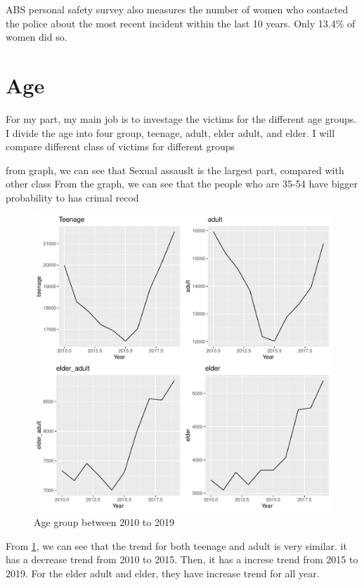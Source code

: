 \documentclass[11pt,a4paper,]{article}
\begin{document}
ABS personal safety survey also measures the number of women who contacted the police about the most recent incident within the last 10 years. Only 13.4\% of women did so.

\clearpage

\section*{Age}

For my part, my main job is to investage the victims for the different age groups. I divide the age into four group, teenage, adult, elder adult, and elder. I will compare different class of victims for different groups

from graph, we can see that Sexual assauslt is the largest part, compared with other class
From the graph, we can see that the people who are 35-54 have bigger probability to has crimal recod

\begin{figure}
\centering
\includegraphics{report_files/figure-latex/ageplot-1.pdf}
\caption{\label{fig:ageplot}Age group between 2010 to 2019}
\end{figure}

From \ref{fig:ageplot}, we can see that the trend for both teenage and adult is very similar. it has a decrease trend from 2010 to 2015. Then, it has a increse trend from 2015 to 2019. For the elder adult and elder, they have increase trend for all year.
\end{document}
